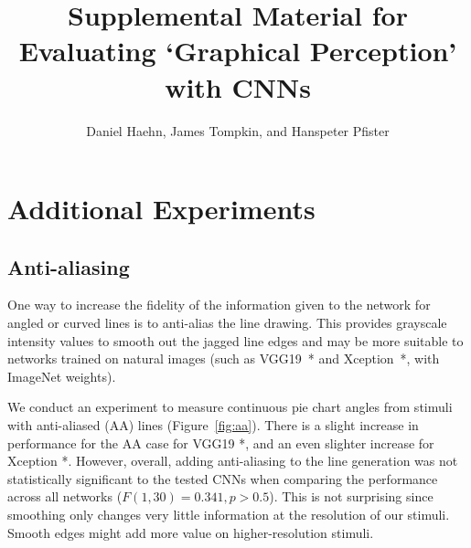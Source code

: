 \documentclass[journal]{vgtc}        %
\title{Supplemental Material for\\Evaluating `Graphical Perception' with CNNs}
\author{Daniel Haehn, James Tompkin, and Hanspeter Pfister}
\newcommand{\tnote}[3]{{\color{#2}#1: #3}}
\newcommand{\JT}[1]{\tnote{JT}{blue}{#1}}
\begin{document}
\maketitle


\section{Additional Experiments}

\subsection{Anti-aliasing}
One way to increase the fidelity of the information given to the network for angled or curved lines is to anti-alias the line drawing. This provides grayscale intensity values to smooth out the jagged line edges and may be more suitable to networks trained on natural images (such as VGG19~* and Xception~*, with ImageNet weights).

We conduct an experiment to measure continuous pie chart angles from stimuli with anti-aliased (AA) lines (Figure~\ref{fig:aa}). There is a slight increase in performance for the AA case for VGG19 *, and an even slighter increase for Xception *. However, overall, adding anti-aliasing to the line generation was not statistically significant to the tested CNNs when comparing the performance across all networks ($F(1,30)=0.341, p>0.5$). This is not surprising since smoothing only changes very little information at the resolution of our stimuli. Smooth edges might add more value on higher-resolution stimuli. %


\end{document}
